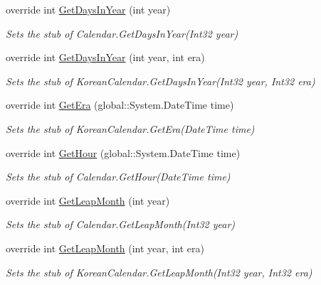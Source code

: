\begin{DoxyCompactItemize}
override int \hyperlink{class_system_1_1_globalization_1_1_fakes_1_1_stub_korean_calendar_a9ba40b0df29b2088088de083e5a0b965}{Get\-Days\-In\-Year} (int year)
\begin{DoxyCompactList}\small\item\em Sets the stub of Calendar.\-Get\-Days\-In\-Year(\-Int32 year)\end{DoxyCompactList}\item 
override int \hyperlink{class_system_1_1_globalization_1_1_fakes_1_1_stub_korean_calendar_a94d3fd2e821f00ef3dae9f7e4980f5d9}{Get\-Days\-In\-Year} (int year, int era)
\begin{DoxyCompactList}\small\item\em Sets the stub of Korean\-Calendar.\-Get\-Days\-In\-Year(\-Int32 year, Int32 era)\end{DoxyCompactList}\item 
override int \hyperlink{class_system_1_1_globalization_1_1_fakes_1_1_stub_korean_calendar_a1dc4273c8e400820fab19c9587188ace}{Get\-Era} (global\-::\-System.\-Date\-Time time)
\begin{DoxyCompactList}\small\item\em Sets the stub of Korean\-Calendar.\-Get\-Era(\-Date\-Time time)\end{DoxyCompactList}\item 
override int \hyperlink{class_system_1_1_globalization_1_1_fakes_1_1_stub_korean_calendar_abdd6f982feff6a179aaca12159ccb9fc}{Get\-Hour} (global\-::\-System.\-Date\-Time time)
\begin{DoxyCompactList}\small\item\em Sets the stub of Calendar.\-Get\-Hour(\-Date\-Time time)\end{DoxyCompactList}\item 
override int \hyperlink{class_system_1_1_globalization_1_1_fakes_1_1_stub_korean_calendar_a7c44a5ba837c0a799bbeeb253366734c}{Get\-Leap\-Month} (int year)
\begin{DoxyCompactList}\small\item\em Sets the stub of Calendar.\-Get\-Leap\-Month(\-Int32 year)\end{DoxyCompactList}\item 
override int \hyperlink{class_system_1_1_globalization_1_1_fakes_1_1_stub_korean_calendar_a4db4102d42a5d87b27140043dfab590e}{Get\-Leap\-Month} (int year, int era)
\begin{DoxyCompactList}\small\item\em Sets the stub of Korean\-Calendar.\-Get\-Leap\-Month(\-Int32 year, Int32 era)\end{DoxyCompactList}\item 

\end{DoxyCompactItemize}
